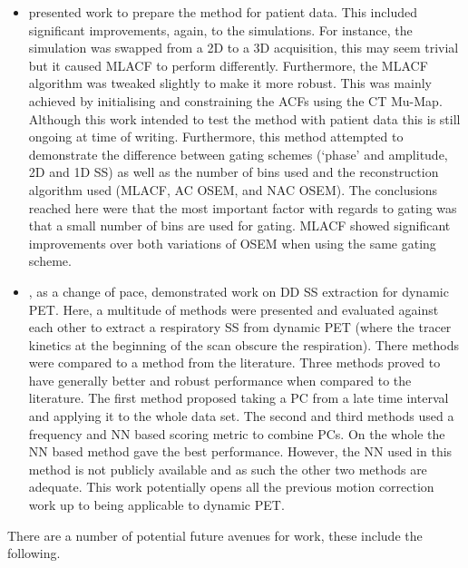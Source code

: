 \begin{itemize}
            \item {} presented work to prepare the method for patient data. This included significant improvements, again, to the simulations. For instance, the simulation was swapped from a \gls{2D} to a \gls{3D} acquisition, this may seem trivial but it caused \gls{MLACF} to perform differently. Furthermore, the \gls{MLACF} algorithm was tweaked slightly to make it more robust. This was mainly achieved by initialising and constraining the \glspl{ACF} using the \gls{CT} \gls{Mu-Map}. Although this work intended to test the method with patient data this is still ongoing at time of writing. Furthermore, this method attempted to demonstrate the difference between gating schemes (`phase' and amplitude, \gls{2D} and \gls{1D} \gls{SS}) as well as the number of bins used and the reconstruction algorithm used (\gls{MLACF}, \gls{AC} \gls{OSEM}, and \gls{NAC} \gls{OSEM}). The conclusions reached here were that the most important factor with regards to gating was that a small number of bins are used for gating. \gls{MLACF} showed significant improvements over both variations of \gls{OSEM} when using the same gating scheme.

            \item {}, as a change of pace, demonstrated work on \gls{DD} \gls{SS} extraction for dynamic \gls{PET}. Here, a multitude of methods were presented and evaluated against each other to extract a respiratory \gls{SS} from dynamic \gls{PET} (where the tracer kinetics at the beginning of the scan obscure the respiration). There methods were compared to a method from the literature. Three methods proved to have generally better and robust performance when compared to the literature. The first method proposed taking a \gls{PC} from a late time interval and applying it to the whole data set. The second and third methods used a frequency and \gls{NN} based scoring metric to combine \glspl{PC}. On the whole the \gls{NN} based method gave the best performance. However, the \gls{NN} used in this method is not publicly available and as such the other two methods are adequate. This work potentially opens all the previous motion correction work up to being applicable to dynamic \gls{PET}.
        \end{itemize}

        There are a number of potential future avenues for work, these include the following.

